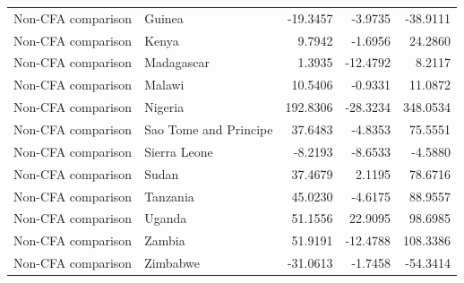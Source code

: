 \begin{table}
\begin{tabular}[t]{llrrr}
Non-CFA comparison & Guinea & -19.3457 & -3.9735 & -38.9111\\
Non-CFA comparison & Kenya & 9.7942 & -1.6956 & 24.2860\\
\addlinespace
Non-CFA comparison & Madagascar & 1.3935 & -12.4792 & 8.2117\\
Non-CFA comparison & Malawi & 10.5406 & -0.9331 & 11.0872\\
Non-CFA comparison & Nigeria & 192.8306 & -28.3234 & 348.0534\\
Non-CFA comparison & Sao Tome and Principe & 37.6483 & -4.8353 & 75.5551\\
Non-CFA comparison & Sierra Leone & -8.2193 & -8.6533 & -4.5880\\
\addlinespace
Non-CFA comparison & Sudan & 37.4679 & 2.1195 & 78.6716\\
Non-CFA comparison & Tanzania & 45.0230 & -4.6175 & 88.9557\\
Non-CFA comparison & Uganda & 51.1556 & 22.9095 & 98.6985\\
Non-CFA comparison & Zambia & 51.9191 & -12.4788 & 108.3386\\
Non-CFA comparison & Zimbabwe & -31.0613 & -1.7458 & -54.3414\\
\bottomrule
\end{tabular}
\end{table}